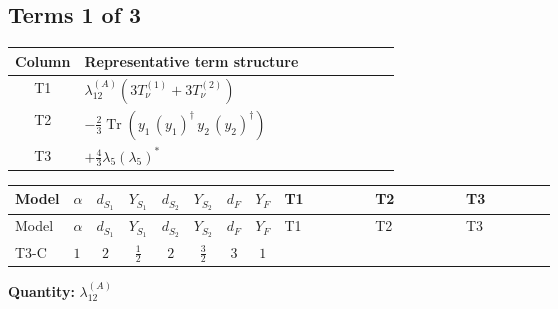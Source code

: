\documentclass[8pt]{article}
\begin{document}
\begin{landscape}
\subsection*{Terms 1 of 3}
\begin{center}
\begin{tabular}{@{}c >{\raggedright\arraybackslash}p{0.82\linewidth}@{}}
\toprule
Column & Representative term structure \\
\midrule
T1 & \(\displaystyle {\lambda_{12}^{(A)}} (3 T_{\nu}^{(1)}+3 T_{\nu}^{(2)})\) \\
\midrule
T2 & \(\displaystyle -\frac{2}{3} \operatorname{Tr}\!\left({y_1}\,\left({y_1}\right)^{\dagger}\,{y_2}\,\left({y_2}\right)^{\dagger}\right)\) \\
\midrule
T3 & \(\displaystyle +\frac{4}{3} {\lambda_5} \left({\lambda_5}\right)^{*}\) \\
\midrule
\bottomrule
\end{tabular}
\end{center}
\smallskip
\tiny
\begin{longtable}{@{}llcccccc >{\raggedright\arraybackslash}p{0.21\linewidth} >{\raggedright\arraybackslash}p{0.21\linewidth} >{\raggedright\arraybackslash}p{0.21\linewidth}@{}}
\toprule
Model & $\alpha$ & $d_{S_1}$ & $Y_{S_1}$ & $d_{S_2}$ & $Y_{S_2}$ & $d_F$ & $Y_F$ & T1 & T2 & T3 \\
\midrule
\endfirsthead
\toprule
Model & $\alpha$ & $d_{S_1}$ & $Y_{S_1}$ & $d_{S_2}$ & $Y_{S_2}$ & $d_F$ & $Y_F$ & T1 & T2 & T3 \\
\midrule
\endhead
T3-C & $1$ & $2$ & $\frac{1}{2}$ & $2$ & $\frac{3}{2}$ & $3$ & $1$ & \scriptsize\adjustbox{max width=\linewidth}{$\begin{gathered} {\lambda_{12}^{(A)}} (3 T_{\nu}^{(1)}+3 T_{\nu}^{(2)})\end{gathered}$} & \scriptsize\adjustbox{max width=\linewidth}{$\begin{gathered} -\frac{2}{3} \operatorname{Tr}\!\left({y_1}\,\left({y_1}\right)^{\dagger}\,{y_2}\,\left({y_2}\right)^{\dagger}\right)\end{gathered}$} & \scriptsize\adjustbox{max width=\linewidth}{$\begin{gathered} +\frac{4}{3} {\lambda_5} \left({\lambda_5}\right)^{*}\end{gathered}$} \\
\midrule
\bottomrule
\end{longtable}
\clearpage
\noindent\textbf{Quantity: }$\lambda_{12}^{(A)}$\par\smallskip

\end{landscape}
\end{document}
